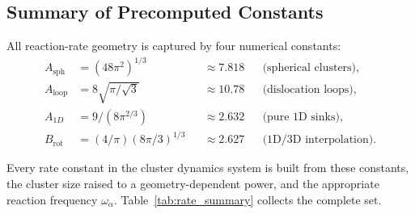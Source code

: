 \documentclass[pdflatex,sn-basic]{sn-jnl} %
\begin{document}
\subsection{Summary of Precomputed Constants}
\label{sec:rate_constants_summary}

All reaction-rate geometry is captured by four numerical constants:
\begin{equation}\label{eq:constants}
    \begin{aligned}
        A_{\mathrm{sph}} &= (48\pi^2)^{1/3} &&\approx 7.818
        && \text{(spherical clusters)}, \\
        A_{\mathrm{loop}} &= 8\sqrt{\pi/\sqrt{3}} &&\approx 10.78
        && \text{(dislocation loops)}, \\
        A_{1D} &= 9/(8\pi^{2/3}) &&\approx 2.632
        && \text{(pure 1D sinks)}, \\
        B_{\mathrm{rot}} &= (4/\pi)(8\pi/3)^{1/3} &&\approx 2.627
        && \text{(1D/3D interpolation)}.
    \end{aligned}
\end{equation}

Every rate constant in the cluster dynamics system is built from these
constants, the cluster size raised to a geometry-dependent power, and the
appropriate reaction frequency $\omega_\alpha$. Table~\ref{tab:rate_summary}
collects the complete set.
\end{document}
